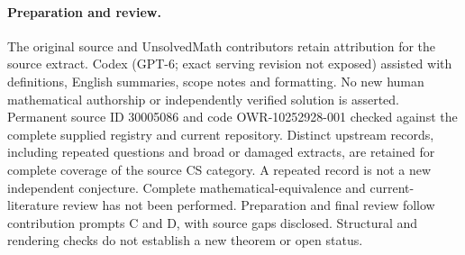 \documentclass[11pt]{article}
\begin{document}
\paragraph{Preparation and review.}
The original source and UnsolvedMath contributors retain attribution for the source extract. Codex (GPT-6; exact serving revision not exposed) assisted with definitions, English summaries, scope notes and formatting. No new human mathematical authorship or independently verified solution is asserted. Permanent source ID 30005086 and code OWR-10252928-001 checked against the complete supplied registry and current repository. Distinct upstream records, including repeated questions and broad or damaged extracts, are retained for complete coverage of the source CS category. A repeated record is not a new independent conjecture. Complete mathematical-equivalence and current-literature review has not been performed. Preparation and final review follow contribution prompts C and D, with source gaps disclosed. Structural and rendering checks do not establish a new theorem or open status.
\label{end:30005086}
\end{document}
